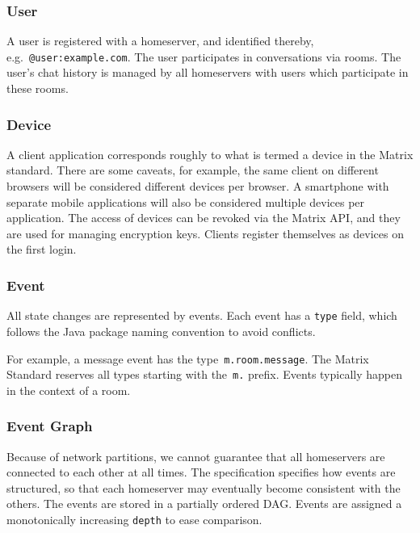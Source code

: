 \subsubsection{User}
A user is registered with a homeserver, and identified thereby, e.g.~\texttt{@user:example.com}.
The user participates in conversations via rooms.
The user's chat history is managed by all homeservers with users which participate in these rooms.

\subsubsection{Device}
A client application corresponds roughly to what is termed a device in the Matrix standard.
There are some caveats, for example, the same client on different browsers will be considered different devices per browser.
A smartphone with separate mobile applications will also be considered multiple devices per application.
The access of devices can be revoked via the Matrix \ac{API}, and they are used for managing encryption keys.
Clients register themselves as devices on the first login.

\subsubsection{Event}
All state changes are represented by events.
Each event has a \texttt{type} field, which follows the Java package naming convention to avoid conflicts.

For example, a message event has the type~\texttt{m.room.message}.
The Matrix Standard reserves all types starting with the~\texttt{m.} prefix.
Events typically happen in the context of a room.

\subsubsection{Event Graph}
Because of network partitions, we cannot guarantee that all homeservers are connected to each other at all times.
The specification specifies how events are structured, so that each homeserver may eventually become consistent with the others.
The events are stored in a partially ordered \ac{DAG}.
Events are assigned a monotonically increasing \texttt{depth} to ease comparison.

